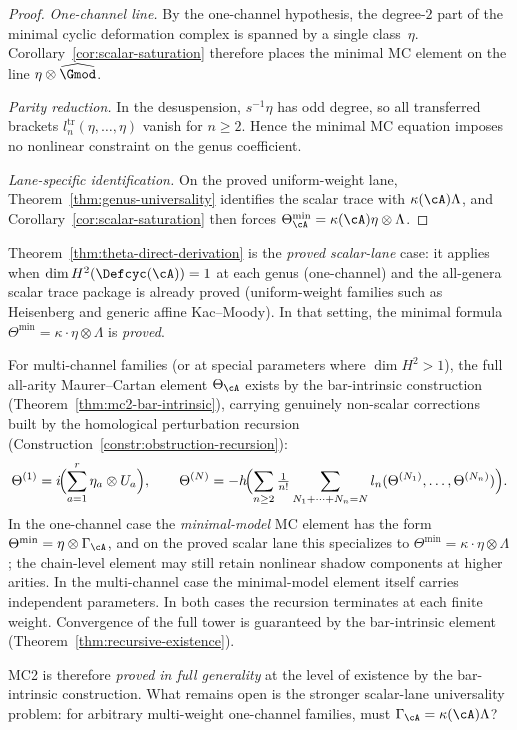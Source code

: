 \begin{proof}
\emph{One-channel line.}
By the one-channel hypothesis, the degree-$2$ part of the minimal
cyclic deformation complex is spanned by a single class~$\eta$.
Corollary~\ref{cor:scalar-saturation} therefore places the minimal
MC element on the line $\eta\otimes\widehat{\Gmod}$.

\emph{Parity reduction.}
In the desuspension, $s^{-1}\eta$ has odd degree, so all transferred
brackets $l_n^{\mathrm{tr}}(\eta,\ldots,\eta)$ vanish for
$n\ge2$.  Hence the minimal MC equation imposes no nonlinear
constraint on the genus coefficient.

\emph{Lane-specific identification.}
On the proved uniform-weight lane,
Theorem~\ref{thm:genus-universality} identifies the scalar trace with
$\kappa(\cA)\Lambda$, and
Corollary~\ref{cor:scalar-saturation} then forces
$\Theta_{\cA}^{\min}
= \kappa(\cA)\eta\otimes\Lambda$.
\end{proof}

\begin{remark}
\label{rem:scalar-saturation-scope-v2}
Theorem~\textup{\ref{thm:theta-direct-derivation}} is the
\emph{proved scalar-lane} case: it applies when
$\dim H^2(\Defcyc(\cA)) = 1$ at each genus
\textup{(}one-channel\textup{)} and the all-genera scalar trace
package is already proved \textup{(}uniform-weight families such as
Heisenberg and generic affine Kac--Moody\textup{)}.  In that
setting, the minimal formula
$\Theta^{\min} = \kappa \cdot \eta \otimes \Lambda$ is
\emph{proved}.

For multi-channel families \textup{(}or at special parameters
where $\dim H^2 > 1$\textup{)}, the full all-arity
Maurer--Cartan element $\Theta_\cA$ exists by the bar-intrinsic
construction \textup{(}Theorem~\textup{\ref{thm:mc2-bar-intrinsic}}),
carrying genuinely non-scalar corrections built by the
homological perturbation recursion
\textup{(}Construction~\textup{\ref{constr:obstruction-recursion}}):
\[
\Theta^{(1)} = i\!\Bigl(\sum_{a=1}^r \eta_a \otimes U_a\Bigr),
\qquad
\Theta^{(N)} = -h\!\Bigl(\sum_{n \geq 2}
\tfrac{1}{n!}\sum_{N_1+\cdots+N_n=N}
l_n(\Theta^{(N_1)},\ldots,\Theta^{(N_n)})\Bigr).
\]
In the one-channel case the \emph{minimal-model} MC element
has the form $\Theta^{\min} = \eta\otimes\Gamma_\cA$, and on the
proved scalar lane this specializes to
$\Theta^{\min} = \kappa \cdot \eta \otimes \Lambda$; the
chain-level element may still retain nonlinear shadow components
at higher arities.  In the multi-channel case the minimal-model
element itself carries independent parameters.
In both cases the recursion terminates at each finite weight.
Convergence of the full tower is guaranteed by the bar-intrinsic
element \textup{(}Theorem~\textup{\ref{thm:recursive-existence})}.

MC2 is therefore \emph{proved in full generality} at the level of
existence by the bar-intrinsic construction.  What remains open is
the stronger scalar-lane universality problem: for arbitrary
multi-weight one-channel families, must
$\Gamma_\cA = \kappa(\cA)\Lambda$?
\end{remark}

